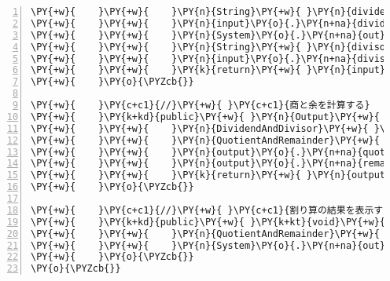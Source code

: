 \begin{Verbatim}[commandchars=\\\{\},numbers=left,firstnumber=1,stepnumber=1,frame=single,fontsize=\small]
\PY{+w}{    }\PY{+w}{    }\PY{n}{String}\PY{+w}{ }\PY{n}{dividendString}\PY{+w}{ }\PY{o}{=}\PY{+w}{ }\PY{n}{reader}\PY{o}{.}\PY{n+na}{readLine}\PY{o}{(}\PY{o}{)}\PY{o}{;}
\PY{+w}{    }\PY{+w}{    }\PY{n}{input}\PY{o}{.}\PY{n+na}{dividend}\PY{+w}{ }\PY{o}{=}\PY{+w}{ }\PY{n}{Integer}\PY{o}{.}\PY{n+na}{parseInt}\PY{o}{(}\PY{n}{dividendString}\PY{o}{)}\PY{o}{;}
\PY{+w}{    }\PY{+w}{    }\PY{n}{System}\PY{o}{.}\PY{n+na}{out}\PY{o}{.}\PY{n+na}{print}\PY{o}{(}\PY{l+s}{"割る数を入力してください："}\PY{o}{)}\PY{o}{;}
\PY{+w}{    }\PY{+w}{    }\PY{n}{String}\PY{+w}{ }\PY{n}{divisorString}\PY{+w}{ }\PY{o}{=}\PY{+w}{ }\PY{n}{reader}\PY{o}{.}\PY{n+na}{readLine}\PY{o}{(}\PY{o}{)}\PY{o}{;}
\PY{+w}{    }\PY{+w}{    }\PY{n}{input}\PY{o}{.}\PY{n+na}{divisor}\PY{+w}{ }\PY{o}{=}\PY{+w}{ }\PY{n}{Integer}\PY{o}{.}\PY{n+na}{parseInt}\PY{o}{(}\PY{n}{divisorString}\PY{o}{)}\PY{o}{;}
\PY{+w}{    }\PY{+w}{    }\PY{k}{return}\PY{+w}{ }\PY{n}{input}\PY{o}{;}
\PY{+w}{    }\PY{o}{\PYZcb{}}

\PY{+w}{    }\PY{c+c1}{//}\PY{+w}{ }\PY{c+c1}{商と余を計算する}
\PY{+w}{    }\PY{k+kd}{public}\PY{+w}{ }\PY{n}{Output}\PY{+w}{ }\PY{n+nf}{process}\PY{o}{(}\PY{n}{Input}\PY{+w}{ }\PY{n}{input}\PY{o}{)}\PY{+w}{ }\PY{o}{\PYZob{}}
\PY{+w}{    }\PY{+w}{    }\PY{n}{DividendAndDivisor}\PY{+w}{ }\PY{n}{dad}\PY{+w}{ }\PY{o}{=}\PY{+w}{ }\PY{o}{(}\PY{n}{DividendAndDivisor}\PY{o}{)}\PY{+w}{ }\PY{n}{input}\PY{o}{;}
\PY{+w}{    }\PY{+w}{    }\PY{n}{QuotientAndRemainder}\PY{+w}{ }\PY{n}{output}\PY{+w}{ }\PY{o}{=}\PY{+w}{ }\PY{k}{new}\PY{+w}{ }\PY{n}{QuotientAndRemainder}\PY{o}{(}\PY{o}{)}\PY{o}{;}
\PY{+w}{    }\PY{+w}{    }\PY{n}{output}\PY{o}{.}\PY{n+na}{quotient}\PY{+w}{ }\PY{o}{=}\PY{+w}{ }\PY{n}{dad}\PY{o}{.}\PY{n+na}{dividend}\PY{+w}{ }\PY{o}{/}\PY{+w}{ }\PY{n}{dad}\PY{o}{.}\PY{n+na}{divisor}\PY{o}{;}
\PY{+w}{    }\PY{+w}{    }\PY{n}{output}\PY{o}{.}\PY{n+na}{remainder}\PY{+w}{ }\PY{o}{=}\PY{+w}{ }\PY{n}{dad}\PY{o}{.}\PY{n+na}{dividend}\PY{+w}{ }\PY{o}{\PYZpc{}}\PY{+w}{ }\PY{n}{dad}\PY{o}{.}\PY{n+na}{divisor}\PY{o}{;}
\PY{+w}{    }\PY{+w}{    }\PY{k}{return}\PY{+w}{ }\PY{n}{output}\PY{o}{;}
\PY{+w}{    }\PY{o}{\PYZcb{}}

\PY{+w}{    }\PY{c+c1}{//}\PY{+w}{ }\PY{c+c1}{割り算の結果を表示する}
\PY{+w}{    }\PY{k+kd}{public}\PY{+w}{ }\PY{k+kt}{void}\PY{+w}{ }\PY{n+nf}{output}\PY{o}{(}\PY{n}{Output}\PY{+w}{ }\PY{n}{output}\PY{o}{)}\PY{+w}{ }\PY{o}{\PYZob{}}
\PY{+w}{    }\PY{+w}{    }\PY{n}{QuotientAndRemainder}\PY{+w}{ }\PY{n}{qar}\PY{+w}{ }\PY{o}{=}\PY{+w}{ }\PY{o}{(}\PY{n}{QuotientAndRemainder}\PY{o}{)}\PY{+w}{ }\PY{n}{output}\PY{o}{;}
\PY{+w}{    }\PY{+w}{    }\PY{n}{System}\PY{o}{.}\PY{n+na}{out}\PY{o}{.}\PY{n+na}{print}\PY{o}{(}\PY{l+s}{"商は"}\PY{+w}{ }\PY{o}{+}\PY{+w}{ }\PY{n}{qar}\PY{o}{.}\PY{n+na}{quotient}\PY{+w}{ }\PY{o}{+}\PY{+w}{ }\PY{l+s}{"で余は"}\PY{+w}{ }\PY{o}{+}\PY{+w}{ }\PY{n}{qar}\PY{o}{.}\PY{n+na}{remainder}\PY{+w}{ }\PY{o}{+}\PY{+w}{ }\PY{l+s}{"です"}\PY{o}{)}\PY{o}{;}
\PY{+w}{    }\PY{o}{\PYZcb{}}
\PY{o}{\PYZcb{}}
\end{Verbatim}
